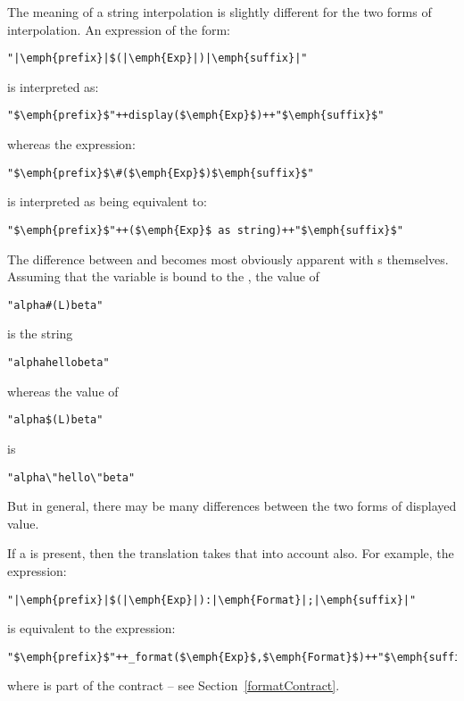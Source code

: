 The meaning of a string interpolation is slightly different for the two forms of interpolation. An expression of the form:
\begin{lstlisting}[escapechar=|]
"|\emph{prefix}|$(|\emph{Exp}|)|\emph{suffix}|"
\end{lstlisting}
is interpreted as:
\begin{lstlisting}[mathescape=true]
"$\emph{prefix}$"++display($\emph{Exp}$)++"$\emph{suffix}$"
\end{lstlisting}
whereas the expression:
\begin{lstlisting}[mathescape=true]
"$\emph{prefix}$\#($\emph{Exp}$)$\emph{suffix}$"
\end{lstlisting}
is interpreted as being equivalent to:
\begin{lstlisting}[mathescape=true]
"$\emph{prefix}$"++($\emph{Exp}$ as string)++"$\emph{suffix}$"
\end{lstlisting}

\begin{aside}
The difference between  and  becomes most obviously apparent with s themselves. Assuming that the variable  is bound to the  , the value of 
\begin{lstlisting}
"alpha#(L)beta"
\end{lstlisting}
is the string
\begin{lstlisting}
"alphahellobeta"
\end{lstlisting}
whereas the value of 
\begin{lstlisting}
"alpha$(L)beta"
\end{lstlisting}
is
\begin{lstlisting}
"alpha\"hello\"beta"
\end{lstlisting}
But in general, there may be many differences between the two forms of displayed value. 
\end{aside}

If a  is present, then the translation takes that into account also. For example, the expression:
\begin{lstlisting}[escapechar=|]
"|\emph{prefix}|$(|\emph{Exp}|):|\emph{Format}|;|\emph{suffix}|"
\end{lstlisting}
is equivalent to the expression:
\begin{lstlisting}[mathescape=true]
"$\emph{prefix}$"++_format($\emph{Exp}$,$\emph{Format}$)++"$\emph{suffix}$"
\end{lstlisting}
where  is part of the  contract -- see Section~\vref{formatContract}.

